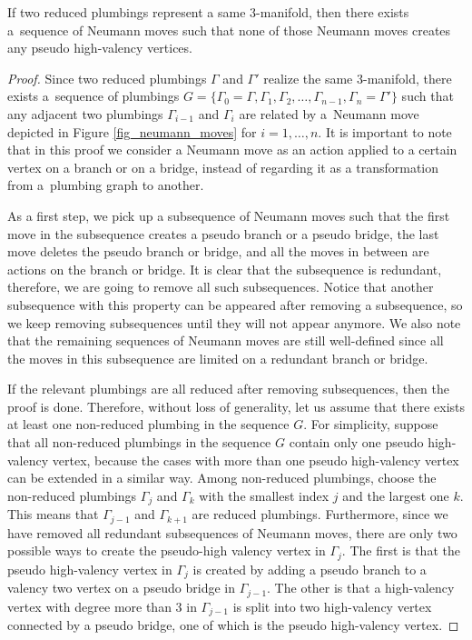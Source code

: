 \begin{Proposition}\label{proposition_relation_reduced_plumbings}
If two reduced plumbings represent a same $3$-manifold, then there exists a~sequence of Neumann moves such that none of those Neumann moves creates any pseudo high-valency vertices.
\end{Proposition}
\begin{proof}
Since two reduced plumbings $\Gamma$ and $\Gamma'$ realize the same 3-manifold, there exists a~sequence of plumbings $G=\{\Gamma_0=\Gamma, \Gamma_1, \Gamma_2, \dots, \Gamma_{n-1}, \Gamma_n=\Gamma'\}$ such that any adjacent two plumbings $\Gamma_{i-1}$ and $\Gamma_i$ are related by a~Neumann move depicted in Figure \ref{fig_neumann_moves} for $i=1, \dots, n$. It is important to note that in this proof we consider a Neumann move as an action applied to a certain vertex on a branch or on a bridge, instead of regarding it as a transformation from a~plumbing graph to another.
	
As a first step, we pick up a subsequence of Neumann moves such that the first move in the subsequence creates a pseudo branch or a pseudo bridge, the last move deletes the pseudo branch or bridge, and all the moves in between are actions on the branch or bridge. It is clear that the subsequence is redundant, therefore, we are going to remove all such subsequences. Notice that another subsequence with this property can be appeared after removing a subsequence, so we keep removing subsequences until they will not appear anymore. We also note that the remaining sequences of Neumann moves are still well-defined since all the moves in this subsequence are limited on a redundant branch or bridge.
	
If the relevant plumbings are all reduced after removing subsequences, then the proof is done. Therefore, without loss of generality, let us assume that there exists at least one non-reduced plumbing in the sequence $G$. For simplicity, suppose that all non-reduced plumbings in the sequence $G$ contain only one pseudo high-valency vertex, because the cases with more than one pseudo high-valency vertex can be extended in a similar way. Among non-reduced plumbings, choose the non-reduced plumbings $\Gamma_j$ and $\Gamma_k$ with the smallest index $j$ and the largest one $k$. This means that $\Gamma_{j-1}$ and $\Gamma_{k+1}$ are reduced plumbings. Furthermore, since we have removed all redundant subsequences of Neumann moves, there are only two possible ways to create the pseudo-high valency vertex in $\Gamma_j$. The first is that the pseudo high-valency vertex in $\Gamma_j$ is created by adding a pseudo branch to a valency two vertex on a pseudo bridge in $\Gamma_{j-1}$. The other is that a high-valency vertex with degree more than 3 in $\Gamma_{j-1}$ is split into two high-valency vertex connected by a pseudo bridge, one of which is the pseudo high-valency vertex.
	

\end{proof}
